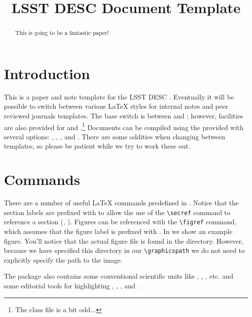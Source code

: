 \documentclass[\docopts]{\docclass}
\begin{document}
 

\title{LSST DESC Document Template}

\maketitlepre

\begin{abstract}

This is going to be a fantastic paper!

\end{abstract}

\maketitlepost

\section{Introduction}
\label{sec:intro}

This is a paper and note template for the LSST DESC \citep{Overview,ScienceBook,WhitePaper}.  
Eventually it will be possible to switch between various \LaTeX\xspace styles for internal notes and peer reviewed journals templates.
The base switch is between  and ; however, facilities are also provided for  and .\footnote{The  class file is a bit odd...}  
Documents can be compiled using the provided  with several options: , , , and . 
There are some oddities when changing between templates, so please be patient while we try to work these out. 

\section{Commands}
\label{sec:commands}

There are a number of useful \LaTeX\xspace commands predefined in .
Notice that the section labels are prefixed with  to allow the use of the \verb=\secref= command to reference a section (\ie, ).
Figures can be referenced with the \verb=\figref= command, which assumes that the figure label is prefixed with .
In  we show an example figure.
You'll notice that the actual figure file is found in the  directory. 
However, because we have specified this directory in our \verb=\graphicspath= we do not need to explicitly specify the path to the image. 

The  package also contains some conventional scientific units like \angstrom, \GeV, \Msun, etc. and some editorial tools for highlighting , , , and .
\end{document}
